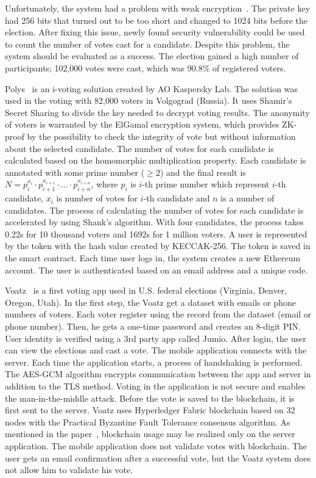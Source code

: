 \documentclass[applsci,article,submit,moreauthors,pdftex]{Definitions/mdpi}
\begin{document}
Unfortunately, the system had a problem with weak encryption~\cite{gaudry2019breaking}.
The private key had 256 bits that turned out to be too short and changed to 1024 bits before the election. After fixing this issue, newly found security vulnerability could be used to count the number of votes cast for a candidate.
Despite this problem, the system should be evaluated as a success. The election gained a high number of participants; 102,000 votes were cast, which was 90.8\% of registered voters.


Polys~\cite{polys:online} is an i-voting solution created by AO Kaspersky Lab. The solution was used in the voting with 82,000  
voters in Volgograd (Russia). It uses Shamir's Secret Sharing to divide the key needed to decrypt voting results. The anonymity of voters is warranted by the ElGamal encryption system, which provides ZK-proof by the possibility to check the integrity of vote but without information about the selected candidate. The number of votes for each candidate is calculated based on the homomorphic multiplication property. Each candidate is annotated with some prime number ($\ge2$) and the final result is $N=p_i^{x_i} \cdot p_{i+1}^{x_{i+1}} \cdot ... \cdot p_{i+n}^{x_{i+n}}$, where $p_i$ is $i$-th prime number which represent $i$-th candidate, $x_i$ is number of votes for $i$-th candidate and $n$ is a number of candidates. The process of calculating the number of votes for each candidate is accelerated by using Shank's algorithm. With four candidates, the process takes 0.22s for 10 thousand voters and 1692s for 1 million voters. A user is represented by the token with the hash value created by KECCAK-256. The token is saved in the smart contract. Each time user logs in, the system creates a new Ethereum account. The user is authenticated based on an email address and a unique code.

Voatz~\cite{moore2019under} is a first voting app used in U.S. federal elections (Virginia, Denver, Oregon, Utah). In the first step, the Voatz get a dataset with emails or phone numbers of voters. Each voter register using the record from the dataset (email or phone number). Then, he gets a one-time password and creates an 8-digit PIN. User identity is verified using a 3rd party app called Jumio. After login, the user can view the elections and cast a vote. The mobile application connects with the server. Each time the application starts, a process of handshaking is performed. The AES-GCM algorithm encrypts communication between the app and server in addition to the TLS method. Voting in the application is not secure and enables the man-in-the-middle attack. Before the vote is saved to the blockchain, it is first sent to the server. Voatz uses Hyperledger Fabric blockchain based on 32 nodes with the Practical Byzantine Fault Tolerance consensus algorithm. As mentioned in the paper~\cite{voatz:specter2020ballot}, blockchain usage may be realized only on the server application. The mobile application does not validate votes with blockchain. The user gets an email confirmation after a successful vote, but the Voatz system does not allow him to validate his vote. 
\end{document}
